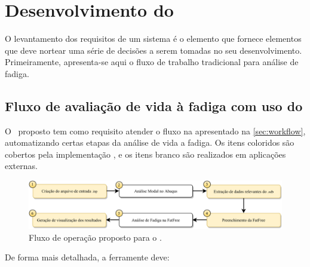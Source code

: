 \chapter{Desenvolvimento do \frame}\label{chap:software}

O levantamento dos requisitos de um sistema é o elemento que fornece elementos que deve nortear uma série de decisões a serem tomadas no seu desenvolvimento. Primeiramente, apresenta-se aqui o fluxo de trabalho tradicional para análise de fadiga.




\section{Fluxo de avaliação de vida à fadiga com uso do \frame}


O \frame\ proposto tem como requisito atender o fluxo na apresentado na \autoref{sec:workflow}, automatizando certas etapas da análise de vida a fadiga. Os itens coloridos são cobertos pela implementação \frame, e os itens  branco são realizados em aplicações externas.


\begin{figure}[!ht]
    \centering
    \caption{Fluxo de operação proposto para o \frame.}\label{fig:workflow}
    \includegraphics[width=\textwidth]{imagens/fluxograma_automatizado}
\end{figure}

De forma mais detalhada, a ferramente deve:

